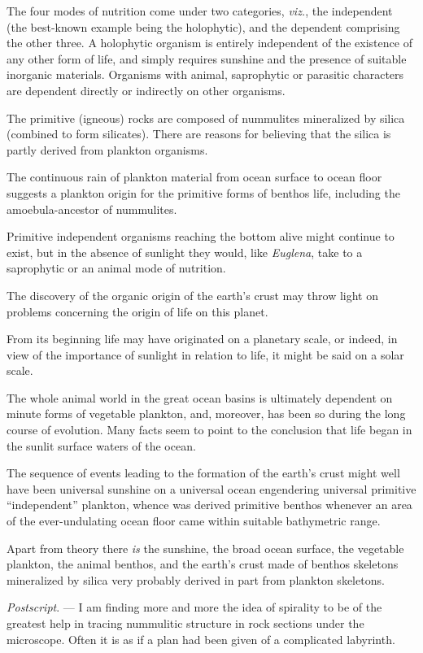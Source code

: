 \documentclass[a4paper, 12pt, oneside]{article}
\begin{document}
The four modes of nutrition come under two categories, \emph{viz.}, the independent (the best-known example being the holophytic), and the dependent comprising the other three. A holophytic organism is entirely independent of the existence of any other form of life, and simply requires sunshine and the presence of suitable inorganic materials. Organisms with animal, saprophytic or parasitic characters are dependent directly or indirectly on other organisms.

The primitive (igneous) rocks are composed of nummulites mineralized by silica (combined to form silicates). There are reasons for believing that the silica is partly derived from plankton organisms.

The continuous rain of plankton material from ocean surface to ocean floor suggests a plankton origin for the primitive forms of benthos life, including the amoebula-ancestor of nummulites.

Primitive independent organisms reaching the bottom alive might continue to exist, but in the absence of sunlight they would, like \emph{Euglena}, take to a saprophytic or an animal mode of nutrition.

The discovery of the organic origin of the earth's crust may throw light on problems concerning the origin of life on this planet.

From its beginning life may have originated on a planetary scale, or indeed, in view of the importance of sunlight in relation to life, it might be said on a solar scale.

The whole animal world in the great ocean basins is ultimately dependent on minute forms of vegetable plankton, and, moreover, has been so during the long course of evolution. Many facts seem to point to the conclusion that life began in the sunlit surface waters of the ocean.

The sequence of events leading to the formation of the earth's crust might well have been universal sunshine on a universal ocean engendering universal primitive ``independent'' plankton, whence was derived primitive benthos whenever an area of the ever-undulating ocean floor came within suitable bathymetric range.

Apart from theory there \emph{is} the sunshine, the broad ocean surface, the vegetable plankton, the animal benthos, and the earth's crust made of benthos skeletons mineralized by silica very probably derived in part from plankton skeletons.

\emph{Postscript}. --- I am finding more and more the idea of spirality to be of the greatest help in tracing nummulitic structure in rock sections under the microscope. Often it is as if a plan had been given of a complicated labyrinth.
\end{document}
